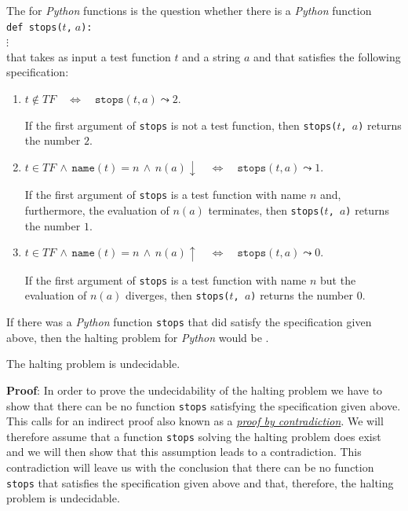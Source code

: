 \noindent
The   for \textsl{Python} functions is the question whether there is a
\textsl{Python} function \\[0.2cm]
\hspace*{1.3cm} \texttt{def stops($t$,$\;a$): } \\
\hspace*{2.3cm} $\vdots$
\\[0.2cm] 
that takes as input a test function $t$ and a string $a$ and that satisfies the following specification:
\begin{enumerate}
\item $t \not\in T\!F \quad\Leftrightarrow\quad \mathtt{stops}(t, a) \leadsto 2$.

      If the first argument of \texttt{stops} is not a test function, then 
      \texttt{stops($t$, $a$)} returns the number $2$.

\item $t \in T\!F \,\wedge\, \mathtt{name}(t) = n \,\wedge\, n(a)\downarrow \quad\Leftrightarrow\quad
       \mathtt{stops}(t, a) \leadsto 1$.

      If the first argument of \texttt{stops} is a test function with name $n$ and, furthermore,
      the evaluation of $n(a)$ terminates, then \texttt{stops($t$, $a$)} returns the number $1$.

\item $t \in T\!F \,\wedge\, \mathtt{name}(t) = n \,\wedge\, n(a)\uparrow \quad\Leftrightarrow\quad
       \mathtt{stops}(t, a) \leadsto 0$.

      If the first argument of \texttt{stops} is a test function with name $n$ but the evaluation of $n(a)$ 
      diverges, then 
      \texttt{stops($t$, $a$)} returns the number $0$.
\end{enumerate}
If there was a \textsl{Python} function \texttt{stops} that did satisfy the specification given above,
then the halting problem for \textsl{Python} would be .

\begin{Theorem}
  The halting problem is undecidable.
\end{Theorem}

\noindent
\textbf{Proof}:  In order to prove the undecidability of the halting problem we have to show that
there can be no function \texttt{stops} satisfying the specification given above.  This calls for an
indirect proof also known as a \href{http://en.wikipedia.org/wiki/Indirect_proof}{\emph{proof by contradiction}}.
We will therefore assume that a function \texttt{stops} solving the halting problem does
exist and we will then show that this assumption leads to a contradiction.  This contradiction will
leave us with the conclusion that there can be no function \texttt{stops} that satisfies
the specification given above and that, therefore, the halting problem is undecidable.

